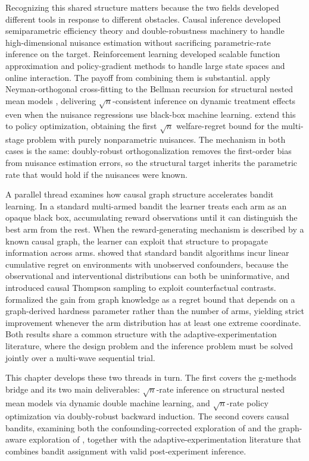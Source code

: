 Recognizing this shared structure matters because the two fields developed different tools in response to different obstacles. Causal inference developed semiparametric efficiency theory and double-robustness machinery to handle high-dimensional nuisance estimation without sacrificing parametric-rate inference on the target. Reinforcement learning developed scalable function approximation and policy-gradient methods to handle large state spaces and online interaction. The payoff from combining them is substantial. \citet{lewisSyrgkanis2021dynamicDML} apply Neyman-orthogonal cross-fitting to the Bellman recursion for structural nested mean models \citep{robins2004snmm}, delivering $\sqrt{n}$-consistent inference on dynamic treatment effects even when the nuisance regressions use black-box machine learning. \citet{sakaguchi2024dynamicpolicy} extend this to policy optimization, obtaining the first $\sqrt{n}$ welfare-regret bound for the multi-stage problem with purely nonparametric nuisances. The mechanism in both cases is the same: doubly-robust orthogonalization removes the first-order bias from nuisance estimation errors, so the structural target inherits the parametric rate that would hold if the nuisances were known.

A parallel thread examines how causal graph structure accelerates bandit learning. In a standard multi-armed bandit the learner treats each arm as an opaque black box, accumulating reward observations until it can distinguish the best arm from the rest. When the reward-generating mechanism is described by a known causal graph, the learner can exploit that structure to propagate information across arms. \citet{bareinboim2015mabuc} showed that standard bandit algorithms incur linear cumulative regret on environments with unobserved confounders, because the observational and interventional distributions can both be uninformative, and introduced causal Thompson sampling to exploit counterfactual contrasts. \citet{lattimore2016causal} formalized the gain from graph knowledge as a regret bound that depends on a graph-derived hardness parameter rather than the number of arms, yielding strict improvement whenever the arm distribution has at least one extreme coordinate. Both results share a common structure with the adaptive-experimentation literature, where the design problem and the inference problem must be solved jointly over a multi-wave sequential trial.

This chapter develops these two threads in turn. The first covers the g-methods bridge and its two main deliverables: $\sqrt{n}$-rate inference on structural nested mean models via dynamic double machine learning, and $\sqrt{n}$-rate policy optimization via doubly-robust backward induction. The second covers causal bandits, examining both the confounding-corrected exploration of \citet{bareinboim2015mabuc} and the graph-aware exploration of \citet{lattimore2016causal}, together with the adaptive-experimentation literature that combines bandit assignment with valid post-experiment inference.

